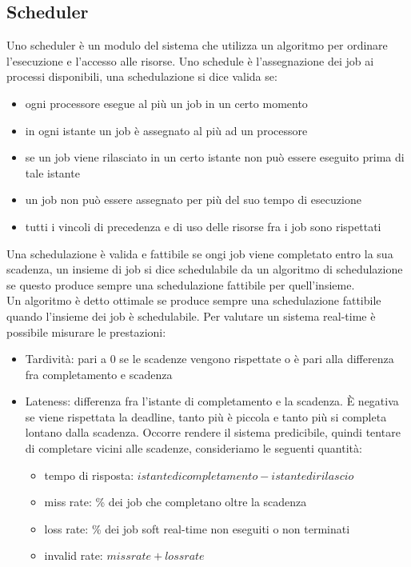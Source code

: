 \documentclass[12pt, oneside]{extbook}
\begin{document}
\subsection{Scheduler}
Uno scheduler è un modulo del sistema che utilizza un algoritmo per ordinare l'esecuzione e l'accesso alle risorse. Uno schedule è l'assegnazione dei job ai processi disponibili, una schedulazione si dice valida se:
\begin{itemize}
\item ogni processore esegue al più un job in un certo momento
\item in ogni istante un job è assegnato al più ad un processore
\item se un job viene rilasciato in un certo istante non può essere eseguito prima di tale istante
\item un job non può essere assegnato per più del suo tempo di esecuzione
\item tutti i vincoli di precedenza e di uso delle risorse fra i job sono rispettati
\end{itemize}
Una schedulazione è valida e fattibile se ongi job viene completato entro la sua scadenza, un insieme di job si dice schedulabile da un algoritmo di schedulazione se questo produce sempre una schedulazione fattibile per quell'insieme.\\ Un algoritmo è detto ottimale se produce sempre una schedulazione fattibile quando l'insieme dei job è schedulabile. Per valutare un sistema real-time è possibile misurare le prestazioni:
\begin{itemize}
\item Tardività: pari a 0 se le scadenze vengono rispettate o è pari alla differenza fra completamento e scadenza
\item Lateness: differenza fra l'istante di completamento e la scadenza. È negativa se viene rispettata la deadline, tanto più è piccola e tanto più si completa lontano dalla scadenza. Occorre rendere il sistema predicibile, quindi tentare di completare vicini alle scadenze, consideriamo le seguenti quantità:
\begin{itemize}
\item tempo di risposta: $istante di completamento - istante di rilascio$
\item miss rate: \% dei job che completano oltre la scadenza
\item loss rate: \% dei job soft real-time non eseguiti o non terminati
\item  invalid rate: $miss rate + loss rate$
\end{itemize}
\end{itemize}
\end{document}
